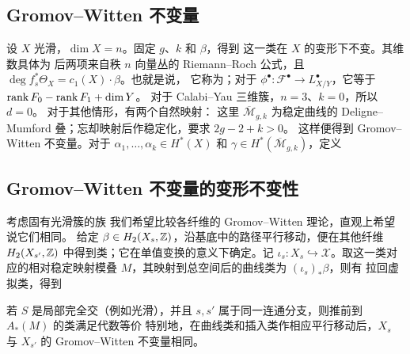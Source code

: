 \subsection{Gromov--Witten 不变量}
设 $X$ 光滑，$\dim X=n$。固定 $g$、$k$ 和 $\beta$，得到
这一类在 $X$ 的变形下不变。其维数具体为
后两项来自秩 $n$ 向量丛的 Riemann--Roch 公式，且 $\deg f_s^*\Theta_X=c_1(X)\cdot\beta$。也就是说，
它称为；对于 $\phi^\bullet:\mathcal F^\bullet\to L_{X/Y}^\bullet$，它等于 $\operatorname{rank} F_0-\operatorname{rank} F_1+\dim Y$。
对于 Calabi--Yau 三维簇，$n=3$、$k=0$，所以 $d=0$。
对于其他情形，有两个自然映射：
这里 $\overline{\mathcal M}_{g,k}$ 为稳定曲线的 Deligne--Mumford 叠；忘却映射后作稳定化，要求 $2g-2+k>0$。
这样便得到 Gromov--Witten 不变量。对于 $\alpha_1,\ldots,\alpha_k\in H^*(X)$ 和 $\gamma\in H^*(\overline{\mathcal M}_{g,k})$，定义
\subsection{Gromov--Witten 不变量的变形不变性}
考虑固有光滑簇的族
我们希望比较各纤维的 Gromov--Witten 理论，直观上希望说它们相同。
给定 $\beta\in H_2(X_s,\mathbb Z)$，沿基底中的路径平行移动，便在其他纤维 $H_2(X_{s'},\mathbb Z)$ 中得到类；它在单值变换的意义下确定。记 $\iota_s:X_s\hookrightarrow\mathcal X$。取这一类对应的相对稳定映射模叠 $M$，其映射到总空间后的曲线类为 $(\iota_s)_*\beta$，则有
拉回虚拟类，得到
\begin{proposition}\label{pro:3.12}
若 $S$ 是局部完全交（例如光滑），并且 $s,s'$ 属于同一连通分支，则推前到 $A_*(M)$ 的类满足代数等价
特别地，在曲线类和插入类作相应平行移动后，$X_s$ 与 $X_{s'}$ 的 Gromov--Witten 不变量相同。
\end{proposition}
